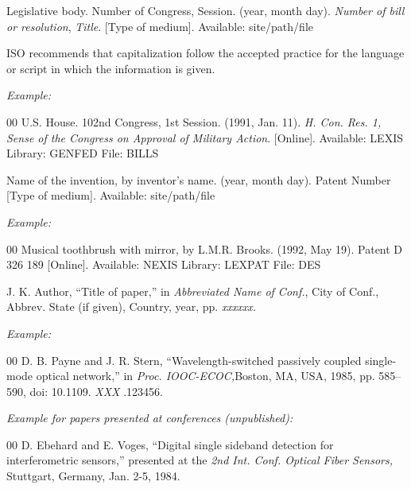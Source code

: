 \documentclass{ieeetj}
\begin{document}

\noindent Legislative body. Number of Congress, Session. (year, month day). {\it Number of bill or resolution}, {\it Title}. [Type
of medium]. Available: site/path/file

 ISO recommends that capitalization follow the accepted
practice for the language or script in which the information is given.



{\it Example:}

\begin{thebibliography}{00}
 U.S. House. 102nd Congress, 1st Session. (1991, Jan. 11). {\it H. Con. Res. 1, Sense of the Congress on Approval of Military Action}. [Online]. Available: LEXIS Library: GENFED File: BILLS
\end{thebibliography}


\noindent Name of the invention, by inventor's name. (year, month day). Patent Number  [Type
of medium]. Available:  {site/path/file}

{\it Example:}

\begin{thebibliography}{00}
 Musical toothbrush with mirror, by L.M.R. Brooks. (1992, May 19). Patent D 326 189 [Online]. Available: NEXIS Library: LEXPAT File: DES
\end{thebibliography}



\noindent J. K. Author, ``Title of paper,'' in {\it Abbreviated Name of Conf.}, City of Conf., Abbrev. State (if
given), Country, year, pp. {\it xxxxxx.}

{\it Example:}

\begin{thebibliography}{00}
 D. B. Payne and J. R. Stern, ``Wavelength-switched passively coupled single-mode optical network,'' in {\it Proc. IOOC-ECOC,}Boston, MA, USA,  1985,
pp. 585--590, doi:  {10.1109.} {{\it XXX}} {.123456}.
\end{thebibliography}

{\it Example for papers presented at conferences (unpublished):}

\begin{thebibliography}{00}
 D. Ebehard and E. Voges, ``Digital single sideband detection for interferometric sensors,'' presented at the {\it 2nd Int. Conf. Optical Fiber Sensors,} Stuttgart, Germany, Jan. 2-5, 1984.
\end{thebibliography}
\end{document}
